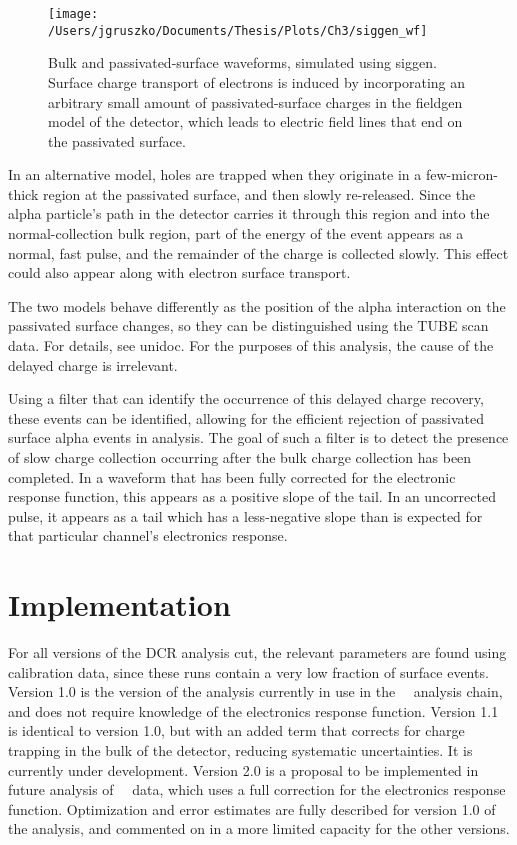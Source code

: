 \begin{figure}[h]
 \centering
 \texttt{[image: /Users/jgruszko/Documents/Thesis/Plots/Ch3/siggen\_wf]}
 \caption[Simulated bulk and passivated surface waveforms]{Bulk and passivated-surface waveforms, simulated using siggen. Surface charge transport of electrons is induced by incorporating an arbitrary small amount of passivated-surface charges in the fieldgen model of the detector, which leads to electric field lines that end on the passivated surface.} 
 \label{fig:siggen_wf}
\end{figure}

In an alternative model, holes are trapped when they originate in a few-micron-thick region at the passivated surface, and then slowly re-released. Since the alpha particle's path in the detector carries it through this region and into the normal-collection bulk region, part of the energy of the event appears as a normal, fast pulse, and the remainder of the charge is collected slowly. This effect could also appear along with electron surface transport. 

The two models behave differently as the position of the alpha interaction on the passivated surface changes, so they can be distinguished using the TUBE scan data. For details, see unidoc. For the purposes of this analysis, the cause of the delayed charge is irrelevant. 

Using a filter that can identify the occurrence of this delayed charge recovery, these events can be identified, allowing for the efficient rejection of passivated surface alpha events in analysis. The goal of such a filter is to detect the presence of slow charge collection occurring after the bulk charge collection has been completed. In a waveform that has been fully corrected for the electronic response function, this appears as a positive slope of the tail. In an uncorrected pulse, it appears as a tail which has a less-negative slope than is expected for that particular channel's electronics response. 

\section{Implementation}
For all versions of the DCR analysis cut, the relevant parameters are found using calibration data, since these runs contain a very low fraction of surface events. Version 1.0 is the version of the analysis currently in use in the \MJ\ \DEM\ analysis chain, and does not require knowledge of the electronics response function. Version 1.1 is identical to version 1.0, but with an added term that corrects for charge trapping in the bulk of the detector, reducing systematic uncertainties. It is currently under development. Version 2.0 is a proposal to be implemented in future analysis of \MJ\ \DEM\ data, which uses a full correction for the electronics response function. Optimization and error estimates are fully described for version 1.0 of the analysis, and commented on in a more limited capacity for the other versions. 

